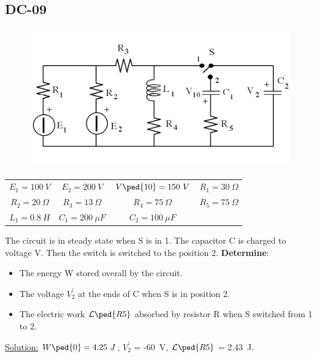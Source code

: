 \subsection{DC-09}
\begin{figure}[h]
\includegraphics[height=6cm]{img/1/09.pdf}
\centering
\end{figure}
\begin{center}
\begin{tabular}{ c c c c}
  $E_1 = 100 \ V$ & $E_2 = 200\ V$ & $V\ped{10} = 150 \ V$ & $R_1 = 30 \ \Omega$\\
  $R_2 = 20 \ \Omega$ & $R_3 = 13 \ \Omega$ & $R_4 = 75 \ \Omega$ & $R_5 = 75 \ \Omega$\\
  $L_1 = 0.8 \ H$ & $C_1 = 200 \ \mu F$ & $C_2 = 100 \ \mu F$\\
\end{tabular}
\end{center}
 The circuit is in steady state when S is in 1. The capacitor C is charged to voltage V. Then the switch is switched to the position 2. \textbf{Determine}:
\begin{itemize}
  \item The energy W stored overall by the circuit.
  \item The voltage $V^{'}_2$ at the ends of C when S is in position 2.
  \item The electric work $\mathcal{L}\ped{R5}$ absorbed by resistor R when S switched from 1 to 2.
\end{itemize}
\underline{\large{Solution:}}
\newline
$W\ped{0} = 4.25\ J$, $V^{'}_2$ = -60\ V, $\mathcal{L}\ped{R5}$ = 2.43\ J.
\newpage



